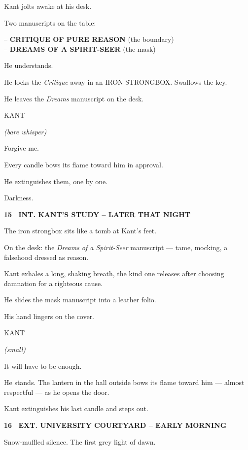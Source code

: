 \documentclass[12pt]{article}
\newcommand{\scene}[2]{%
  \vspace{1.8\baselineskip}%
  \noindent\textbf{#1 \ #2}\par\vspace{0.4\baselineskip}%
}
\newenvironment{dialogue}[1]{%
  \vspace{0.8\baselineskip}%
  \noindent\hspace*{2.3in}\textsc{#1}\par%
  \noindent\hspace*{1.5in}\begin{minipage}[t]{4.5in}%
}{%
  \end{minipage}\par%
}
\newcommand{\paren}[1]{%
  \noindent\hspace*{1.8in}\textit{(#1)}\par%
}
\begin{document}
Kant jolts awake at his desk.

Two manuscripts on the table:

-- \textbf{CRITIQUE OF PURE REASON} (the boundary)\\
-- \textbf{DREAMS OF A SPIRIT-SEER} (the mask)

He understands.

He locks the \emph{Critique} away in an IRON STRONGBOX. Swallows the key.

He leaves the \emph{Dreams} manuscript on the desk.

\begin{dialogue}{KANT}
\paren{bare whisper}
Forgive me.
\end{dialogue}

Every candle bows its flame toward him in approval.

He extinguishes them, one by one.

Darkness.


\scene{15}{INT. KANT'S STUDY -- LATER THAT NIGHT}

The iron strongbox sits like a tomb at Kant's feet.

On the desk: the \emph{Dreams of a Spirit-Seer} manuscript --- tame,
mocking, a falsehood dressed as reason.

Kant exhales a long, shaking breath, the kind one releases after
choosing damnation for a righteous cause.

He slides the mask manuscript into a leather folio.

His hand lingers on the cover.

\begin{dialogue}{KANT}
\paren{small}
It will have to be enough.
\end{dialogue}

He stands. The lantern in the hall outside bows its flame toward him ---
almost respectful --- as he opens the door.

Kant extinguishes his last candle and steps out.


\scene{16}{EXT. UNIVERSITY COURTYARD -- EARLY MORNING}

Snow-muffled silence. The first grey light of dawn.
\end{document}
